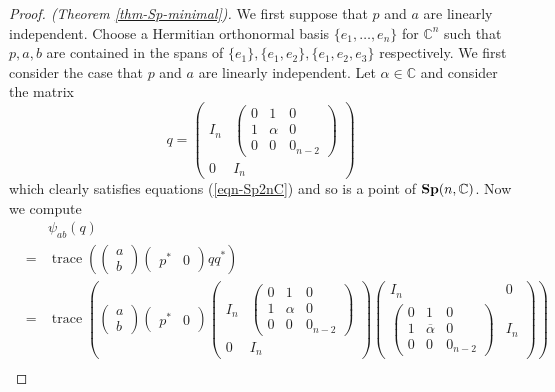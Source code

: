\documentclass[11pt,reqno]{amsart}
\theoremstyle{plain}
\theoremstyle{definition}
\numberwithin{equation}{section}
\def \cn{{\mathbb C}}
\def \Sp#1{\text{\bf Sp}(#1)}
\DeclareMathOperator{\trace}{trace}
\numberwithin{equation}{section}
\begin{document}
\begin{proof}[Proof. (Theorem \ref{thm-Sp-minimal})]
	We first suppose that $p$ and $a$ are linearly independent. Choose a Hermitian orthonormal basis $\{e_1,\dots, e_n\}$ for $\cn^n$ such that $p,a,b$ are contained in the spans of $\{e_1\},\{e_1,e_2\},\{e_1,e_2,e_3\}$ respectively. We first consider the case that $p$ and $a$ are linearly independent.
	Let $\alpha \in \cn$ and consider the matrix
	$$ q =\begin{pmatrix}
		I_n & \begin{pmatrix}
		0  & 1 &0 \\ 1  & \alpha & 0 \\ 0 & 0 & 0_{n-2}
		\end{pmatrix} \\ 0 & I_{n}
	\end{pmatrix} $$
	which clearly satisfies equations (\ref{eqn-Sp2nC}) and so is a point of $\Sp{n,\cn}$.
	Now we compute
	\begin{eqnarray*}
		&&\psi_{ab}(q) \\&=& \trace\left( \begin{pmatrix}
	a \\ b
\end{pmatrix} \begin{pmatrix}
p^* & 0
\end{pmatrix}  q q^*\right) \\
&=& \trace\left( \begin{pmatrix}
	a \\ b
\end{pmatrix} \begin{pmatrix}
p^* & 0
\end{pmatrix}  \begin{pmatrix}
		I_n & \begin{pmatrix}
		0  & 1 &0 \\ 1  & \alpha & 0 \\ 0 & 0 & 0_{n-2}
		\end{pmatrix} \\ 0 & I_{n}
	\end{pmatrix} 
	\begin{pmatrix}
		I_n & 0 \\ \begin{pmatrix}
		0  & 1 &0 \\ 1  & \overline{\alpha} & 0 \\ 0 & 0 & 0_{n-2}
		\end{pmatrix} & I_{n}
	\end{pmatrix} \right) \\

\end{eqnarray*}
\end{proof}
\end{document}
